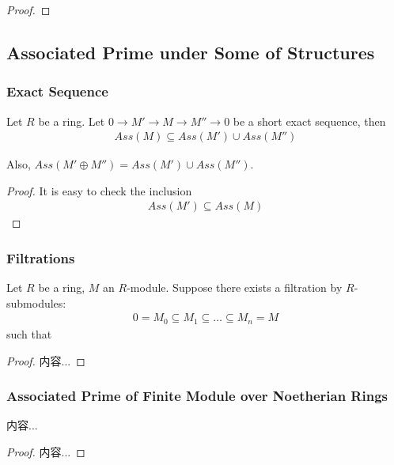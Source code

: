 \documentclass[Total.tex]{subfiles}
\begin{document}
			\begin{proof}
			\end{proof}
			
			\subsection{Associated Prime under Some of Structures}
			
			\subsubsection{Exact Sequence}
			
			\begin{lemma}
				Let $R$ be a ring. Let $0\rightarrow M'\rightarrow M\rightarrow M''\rightarrow 0$ be a short exact sequence, then
				\begin{gather*}
					Ass(M)\subseteq Ass(M')\cup Ass(M'')
				\end{gather*}
				
				Also, $Ass(M'\oplus M'')=Ass(M')\cup Ass(M'')$.
			\end{lemma}
			
			\begin{proof}
				It is easy to check the inclusion
				\begin{gather*}
					Ass(M')\subseteq Ass(M)
				\end{gather*}
				
			\end{proof}
			
			\subsubsection{Filtrations}
			\begin{lemma}
				Let $R$ be a ring, $M$ an $R$-module. Suppose there exists a filtration by $R$-submodules:
				\begin{gather*}
					0=M_0\subseteq M_1\subseteq\dots\subseteq M_n=M
				\end{gather*}
				such that 
			\end{lemma}
			\begin{proof}
				内容...
			\end{proof}
			\subsubsection{Associated Prime of Finite Module over Noetherian Rings}
			\begin{lemma}
				内容...
			\end{lemma}
			\begin{proof}
				内容...
			\end{proof}
\end{document}
